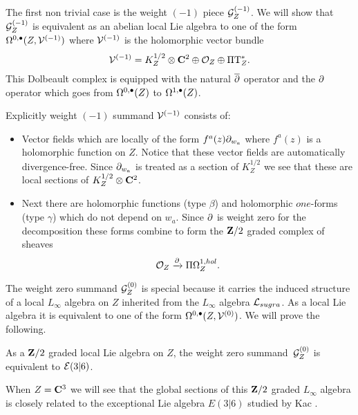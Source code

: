 \parsec[s:weight-1]

The first non trivial case is the weight $(-1)$ piece $\mathcal G_Z^{(-1)}$.
We will show that
$\mathcal G_Z^{(-1)}$ is equivalent as an abelian local Lie algebra to one of the form $\Omega^{0,\bullet}(Z, \mathcal V^{(-1)})$ where $\mathcal V^{(-1)}$ is the holomorphic vector bundle
\[
\mathcal V^{(-1)} = K^{1/2}_Z \otimes \mathbf{C}^2 \oplus \mathcal O_Z \oplus \Pi {\rm T}^*_Z .
\]
This Dolbeault complex is equipped with the natural $\overline{\partial}$ operator and the $\partial$ operator which goes from $\Omega^{0,\bullet}(Z)$ to $\Omega^{1,\bullet}(Z)$. 

Explicitly weight $(-1)$ summand $\mathcal V^{(-1)}$ consists of:
\begin{itemize}
\item 
Vector fields which are locally of the form $f^a(z) \partial_{w_a}$ where $f^{a}(z)$ is a holomorphic function on $Z$.
Notice that these vector fields are automatically divergence-free.
Since $\partial_{w_a}$ is treated as a section of $K^{1/2}_Z$ we see that these are local sections of $K^{1/2}_Z \otimes \mathbf{C}^2$. 
\item 
Next there are holomorphic functions (type $\beta$) and holomorphic $one$-forms (type $\gamma$) which do not depend on $w_a$. 
Since $\partial$ is weight zero for the decomposition these forms combine to form the $\mathbf{Z}/2$ graded complex of sheaves
\[
\mathcal O_Z \xrightarrow{\partial} \Pi \Omega^{1,hol}_Z .
\]
\end{itemize}

\parsec[s:weight0]

The weight zero summand $\mathcal G_Z^{(0)}$ is special because it carries the induced structure of a local $L_\infty$ algebra on $Z$ inherited from the $L_\infty$ algebra $\mathcal L_{sugra}$.
As a local Lie algebra it is equivalent to one of the form $\Omega^{0,\bullet}(Z, \mathcal V^{(0)})$.
We will prove the following.

\begin{prop}\label{prop:v0}
As a $\mathbf{Z}/2$ graded local Lie algebra on $Z$, the weight zero summand~$\mathcal G^{(0)}_Z$ is equivalent to $\mathcal E(3|6)$. 
\end{prop}

When $Z = \mathbf{C}^3$ we will see that the global sections of this $\mathbf{Z}/2$ graded $L_\infty$ algebra is closely related to the exceptional Lie algebra $E(3|6)$ studied by Kac \cite{KacClass}.


